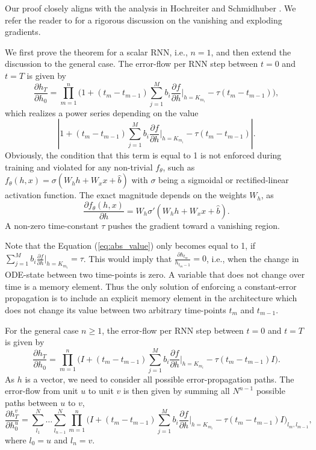 \documentclass{article}
\begin{document}
Our proof closely aligns with the analysis in Hochreiter and Schmidhuber \cite{hochreiter1997long}. We refer the reader to \cite{hochreiter1991untersuchungen,bengio1994learning,pascanu2013difficulty} for a rigorous discussion on the vanishing and exploding gradients. 

We first prove the theorem for a scalar RNN, i.e., $n=1$, and then extend the discussion to the general case.
The error-flow per RNN step between $t=0$ and $t=T$ is given by
\begin{equation}
    \frac{\partial h_{T}}{\partial h_{0}} = \prod_{m=1}^{n}\Big( 1 + (t_m-t_{m-1})\sum_{j=1}^{M} b_i \frac{\partial f}{\partial h}\Big|_{h=K_{m_i}} - \tau (t_m-t_{m-1}) \Big),
\end{equation}
which realizes a power series depending on the value 
\begin{equation}\label{eq:abs_value}
    | 1 + (t_m-t_{m-1})\sum_{j=1}^{M} b_i \frac{\partial f}{\partial h}\Big|_{h=K_{m_i}} - \tau (t_m-t_{m-1})|.
\end{equation}
Obviously, the condition that this term is equal to 1 is not enforced during training and violated for any non-trivial $f_\theta$, such as $f_{\theta}(h,x) = \sigma(W_h h + W_x x + \hat{b})$ with $\sigma$ being a sigmoidal or rectified-linear activation function. The exact magnitude depends on the weights $W_h$, as
\begin{equation}
    \frac{\partial f_{\theta}(h,x)}{\partial h} = W_h \sigma'(W_h h + W_x x + \hat{b}).
\end{equation}
A non-zero time-constant $\tau$ pushes the gradient toward a vanishing region.

Note that the Equation (\ref{eq:abs_value}) only becomes equal to 1, if $\sum_{j=1}^{M} b_i \frac{\partial f}{\partial h}\Big|_{h=K_{m_i}}=\tau$. This would imply that $\frac{\partial h_{t_m}}{h_{t_m-1}} =0$, i.e., when the change in ODE-state between two time-points is zero. A variable that does not change over time is a memory element. Thus the only solution of enforcing a constant-error propagation is to include an explicit memory element in the architecture \cite{hochreiter1997long} which does not change its value between two arbitrary time-points $t_m$ and $t_{m-1}$.

For the general case $n\geq 1$, the error-flow per RNN step between $t=0$ and $t=T$ is given by
\begin{equation}
    \frac{\partial h_{T}}{\partial h_{0}} = \prod_{m=1}^{n}\Big( I + (t_m-t_{m-1})\sum_{j=1}^{M} b_i \frac{\partial f}{\partial h}\Big|_{h=K_{m_i}} - \tau (t_m-t_{m-1}) I \Big).
\end{equation}
As $h$ is a vector, we need to consider all possible error-propagation paths.
The error-flow from unit $u$ to unit $v$ is then given by summing all $N^{n-1}$ possible paths between $u$ to $v$,
\begin{equation}\label{eq:big}
    \frac{\partial h^v_{T}}{\partial h^u_{0}} =  \sum_{l_1}^{N} \dots \sum_{l_{n-1}}^{N} \prod_{m=1}^{n}\Big( I + (t_m-t_{m-1})\sum_{j=1}^{M} b_i \frac{\partial f}{\partial h}\Big|_{h=K_{m_i}} - \tau (t_m-t_{m-1}) I \Big)_{l_m,l_{m-1}},
\end{equation}
where $l_0=u$ and $l_n=v$.
\end{document}
